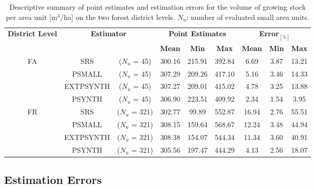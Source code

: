 \documentclass[remotesensing,article,accept,moreauthors,pdftex,10pt,a4paper]{Definitions/mdpi}
\begin{document}
\begin{table}[H]
	\begin{center}
		\caption{Descriptive summary of point estimates and estimation errors for the volume of growing stock per area unit [m$^3$/ha] on the two forest district levels. $N_u$: number of evaluated small area units.}
	
		\label{tab:estres}
		{\small %
			\begin{tabular}{ccccccccc} %
				\toprule
				\multirow{2}{*}{\textbf{\vspace{-3PT}
 District Level}} & \multicolumn{2}{c}{\multirow{2}{*}{\vspace{-3PT}\textbf{Estimator}}} & \multicolumn{3}{c}{\textbf{Point Estimates}} & \multicolumn{3}{c}{\textbf{Error}\boldmath$_{[\%]}$} \\
				\cmidrule{4-9} & & & \textbf{Mean} & \textbf{Min} & \textbf{Max} & \textbf{Mean} & \textbf{Min} & \textbf{Max} \\
			\midrule
				\multirow{4}{*}{FA} & SRS       & ($N_u$ = 45)  & 300.16 & 215.91 & 392.84 &  6.69 & 3.87 & 13.21 \\
				& PSMALL    & ($N_u$ = 45)  & 307.29 & 209.26 & 417.10 &  5.16 & 3.46 & 14.33 \\
				& EXTPSYNTH & ($N_u$ = 45)  & 307.27 & 209.01 & 415.02 &  4.78 & 3.25 & 13.88 \\
				& PSYNTH    & ($N_u$ = 45)  & 306.90 & 223.51 & 409.92 &  2.34 & 1.54 &  3.95 \\
				\midrule
				\multirow{4}{*}{FR} & SRS       & ($N_u$ = 321) & 302.77 &  99.89 & 552.87 & 16.94 & 2.76 & 55.51 \\
				& PSMALL    & ($N_u$ = 321) & 308.15 & 159.64 & 568.67 & 12.24 & 3.48 &  44.94 \\
				& EXTPSYNTH & ($N_u$ = 321) & 308.38 & 154.07 & 544.34 & 11.34 & 3.60 &  40.91 \\
				& PSYNTH    & ($N_u$ = 321) & 305.56 & 197.47 & 444.29 & 4.13  & 2.56 &  18.07 \\
			\bottomrule
			\end{tabular}
		}%
	\end{center}
\end{table}

\vspace{-12pt}

\subsection{Estimation Errors}
\label{sec:esterr}
\end{document}
